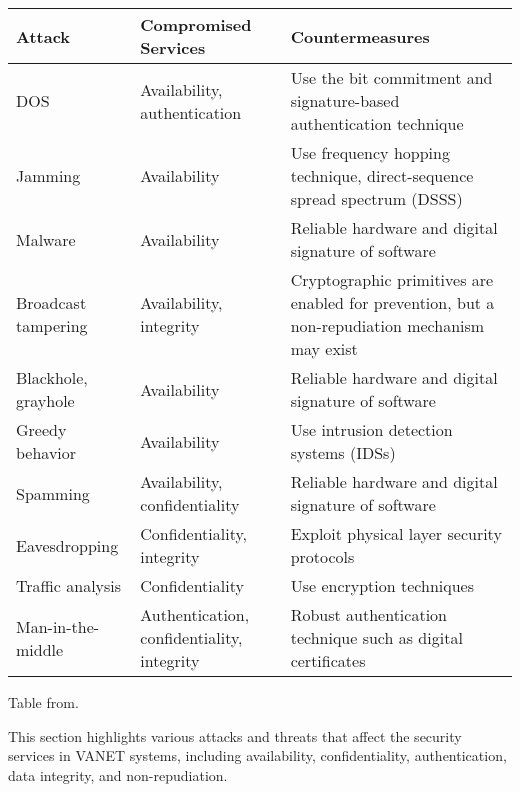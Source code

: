 \begin{table}[h]
    \centering
    \begin{tabular}{|l|l|l|}
        \hline
        \textbf{Attack} & \textbf{Compromised Services} & \textbf{Countermeasures} \\ \hline
        DOS & Availability, authentication & Use the bit commitment and signature-based authentication technique \\ \hline
        Jamming & Availability & Use frequency hopping technique, direct-sequence spread spectrum (DSSS) \\ \hline
        Malware & Availability & Reliable hardware and digital signature of software \\ \hline
        Broadcast tampering & Availability, integrity & Cryptographic primitives are enabled for prevention, but a non-repudiation mechanism may exist \\ \hline
        Blackhole, grayhole & Availability & Reliable hardware and digital signature of software \\ \hline
        Greedy behavior & Availability & Use intrusion detection systems (IDSs) \\ \hline
        Spamming & Availability, confidentiality & Reliable hardware and digital signature of software \\ \hline
        Eavesdropping & Confidentiality, integrity & Exploit physical layer security protocols \\ \hline
        Traffic analysis & Confidentiality & Use encryption techniques \\ \hline
        Man-in-the-middle & Authentication, confidentiality, integrity & Robust authentication technique such as digital certificates \\ \hline
    \end{tabular}
    \label{tab:Summary of Attacks and Countermeasures. }
\end{table}

Table from\cite{sheikh2019comprehensive}.


This section highlights various attacks and threats that affect the security services in VANET systems, including availability, confidentiality, authentication, data integrity, and non-repudiation.

